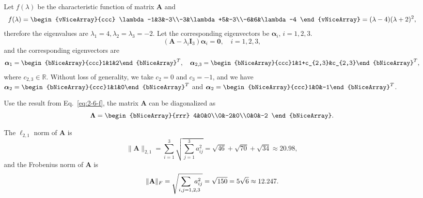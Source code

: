 \documentclass[oneside,solution]{seu-ml-assign}
\begin{document}
\subproblem{}
Let $f(\lambda)$ be the characteristic function of matrix $\mathbf{A}$ and
\begin{equation}\label{eq:2-6-f}
    f(\lambda)=\begin{vNiceArray}{ccc}
        \lambda-1&3&-3\\-3&\lambda+5&-3\\-6&6&\lambda-4
    \end{vNiceArray}=(\lambda-4)(\lambda+2)^2,
\end{equation}
therefore the eigenvalues are $\lambda_1=4, \lambda_2=\lambda_3=-2$.
Let the corresponding eigenvectors be $\bm{\alpha}_i$, $i=1,2,3$.
\begin{equation}
    (\mathbf{A}-\lambda_i\mathbf{I}_3)\bm{\alpha}_i=\mathbf{0},\quad i=1,2,3,
\end{equation}
and the corresponding eigenvectors are
\begin{equation}
    \bm{\alpha}_1=\begin{bNiceArray}{ccc}1&1&2\end{bNiceArray}^T,\quad
    \bm{\alpha}_{2,3}=\begin{bNiceArray}{ccc}1&1+c_{2,3}&c_{2,3}\end{bNiceArray}^T,
\end{equation}
where $c_{2,3}\in\mathbb{R}$.
Without loss of generality, we take $c_2=0$ and $c_3=-1$, and we have $\bm{\alpha}_2=\begin{bNiceArray}{ccc}1&1&0\end{bNiceArray}^T$ and $\bm{\alpha}_2=\begin{bNiceArray}{ccc}1&0&-1\end{bNiceArray}^T$.

\subproblem{}
Use the result from Eq.~\eqref{eq:2-6-f}, the matrix $\mathbf{A}$ can be diagonalized as
\begin{equation}
    \bm{\Lambda}=\begin{bNiceArray}{rrr}
        4&0&0\\0&-2&0\\0&0&-2
    \end{bNiceArray}.
\end{equation}

\subproblem{}
The $\ell_{2,1}$ norm of $\mathbf{A}$ is
\begin{equation}
    \|\mathbf{A}\|_{2,1}=\sum_{i=1}^3\sqrt{\sum_{j=1}^3a_{ij}^2}=\sqrt{46}+\sqrt{70}+\sqrt{34}\approx 20.98,
\end{equation}
and the Frobenius norm of $\mathbf{A}$ is
\begin{equation}
    \|\mathbf{A}\|_F=\sqrt{\sum_{i,j=1,\mathrlap{2,3}}a_{ij}^2}=\sqrt{150}=5\sqrt{6}\approx 12.247.
\end{equation}
\end{document}
